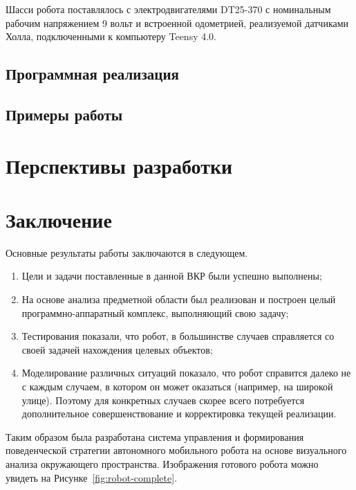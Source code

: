 \documentclass[12pt,a4paper]{scrartcl}
\begin{document}
				Шасси робота поставлялось с электродвигателями DT25-370 с номинальным рабочим напряжением 9 вольт и встроенной одометрией, реализуемой датчиками Холла, подключенными к компьютеру Teensy 4.0\cite{bib:DT25-370Desc}.
			\subsection{Программная реализация}
				
				
			\subsection{Примеры работы}
			
		\section{Перспективы разработки} \label{sec:perspective}
			
			
		\section*{Заключение}
			Основные результаты работы заключаются в следующем.
			\begin{enumerate}
				\item Цели и задачи поставленные в данной ВКР были успешно выполнены;
				\item На основе анализа предметной области был реализован и построен целый программно-аппаратный комплекс, выполняющий свою задачу;
				\item Тестирования показали, что робот, в большинстве случаев справляется со своей задачей нахождения целевых объектов;
				\item Моделирование различных ситуаций показало, что робот справится далеко не с каждым случаем, в котором он может оказаться (например, на широкой улице). Поэтому для конкретных случаев скорее всего потребуется дополнительное совершенствование и корректировка текущей реализации.
			\end{enumerate}
			
			Таким образом была разработана система управления и формирования поведенческой стратегии автономного мобильного робота на основе визуального анализа окружающего пространства. Изображения готового робота можно увидеть на Рисунке~\ref{fig:robot-complete}.
			
\end{document}
